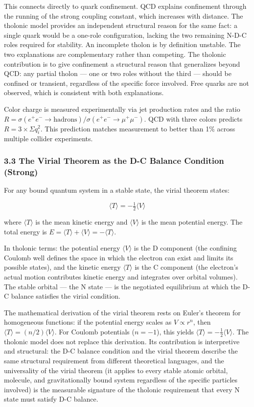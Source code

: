 \documentclass[
  11pt,
  letterpaper,
]{article}
\begin{document}
This connects directly to quark confinement. QCD explains confinement
through the running of the strong coupling constant, which increases
with distance. The tholonic model provides an independent structural
reason for the same fact: a single quark would be a one-role
configuration, lacking the two remaining N-D-C roles required for
stability. An incomplete tholon is by definition unstable. The two
explanations are complementary rather than competing. The tholonic
contribution is to give confinement a structural reason that generalizes
beyond QCD: any partial tholon --- one or two roles without the third
--- should be confined or transient, regardless of the specific force
involved. Free quarks are not observed, which is consistent with both
explanations.

Color charge is measured experimentally via jet production rates and the
ratio
\(R = \sigma(e^+e^- \to \text{hadrons}) / \sigma(e^+e^- \to \mu^+\mu^-)\).
QCD with three colors predicts \(R = 3 \times \Sigma q_i^2\). This
prediction matches measurement to better than 1\% across multiple
collider experiments.

\subsubsection{3.3 The Virial Theorem as the D-C Balance Condition
(Strong)}\label{the-virial-theorem-as-the-d-c-balance-condition-strong}

For any bound quantum system in a stable state, the virial theorem
states:

\[\langle T \rangle = -\tfrac{1}{2}\langle V \rangle\]

where \(\langle T \rangle\) is the mean kinetic energy and
\(\langle V \rangle\) is the mean potential energy. The total energy is
\(E = \langle T \rangle + \langle V \rangle = -\langle T \rangle\).

In tholonic terms: the potential energy \(\langle V \rangle\) is the D
component (the confining Coulomb well defines the space in which the
electron can exist and limits its possible states), and the kinetic
energy \(\langle T \rangle\) is the C component (the electron's actual
motion contributes kinetic energy and integrates over orbital volumes).
The stable orbital --- the N state --- is the negotiated equilibrium at
which the D-C balance satisfies the virial condition.

The mathematical derivation of the virial theorem rests on Euler's
theorem for homogeneous functions: if the potential energy scales as
\(V \propto r^n\), then \(\langle T \rangle = (n/2)\langle V \rangle\).
For Coulomb potentials (\(n = -1\)), this yields
\(\langle T \rangle = -\tfrac{1}{2}\langle V \rangle\). The tholonic
model does not replace this derivation. Its contribution is interpretive
and structural: the D-C balance condition and the virial theorem
describe the same structural requirement from different theoretical
languages, and the universality of the virial theorem (it applies to
every stable atomic orbital, molecule, and gravitationally bound system
regardless of the specific particles involved) is the measurable
signature of the tholonic requirement that every N state must satisfy
D-C balance.
\end{document}
